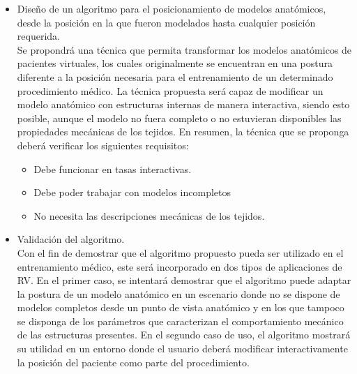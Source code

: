 \begin{itemize}
\item Diseño de un algoritmo para el posicionamiento de modelos anatómicos, desde la posición en la que fueron modelados hasta cualquier posición requerida.
\\

Se propondrá una técnica que permita transformar los modelos anatómicos de pacientes virtuales, los cuales originalmente se encuentran en una postura diferente a la posición necesaria para el entrenamiento de un determinado procedimiento médico. %
La técnica propuesta será capaz de modificar un modelo anatómico con estructuras internas de manera interactiva, siendo esto posible, aunque el modelo no fuera completo o no estuvieran disponibles las propiedades mecánicas de los tejidos. En resumen, la técnica que se proponga deberá verificar los siguientes requisitos:

\begin{itemize}
    \item Debe funcionar en tasas interactivas.
    \item Debe poder trabajar con modelos incompletos
    \item No necesita las descripciones mecánicas de los tejidos.
    
\end{itemize}


\item 	Validación del algoritmo. \\
Con el fin de demostrar que el algoritmo propuesto pueda ser utilizado en el entrenamiento médico, este será incorporado en dos tipos de aplicaciones de \ac{RV}. En el primer caso, se intentará demostrar que el algoritmo puede adaptar la postura de un modelo anatómico en un escenario donde no se dispone de modelos completos desde un punto de vista anatómico y en los que tampoco se disponga de los parámetros que caracterizan el comportamiento mecánico de las estructuras presentes. En el segundo caso de uso, el algoritmo mostrará su utilidad en un entorno donde el usuario deberá modificar interactivamente la posición del paciente como parte del procedimiento. 


\end{itemize}
